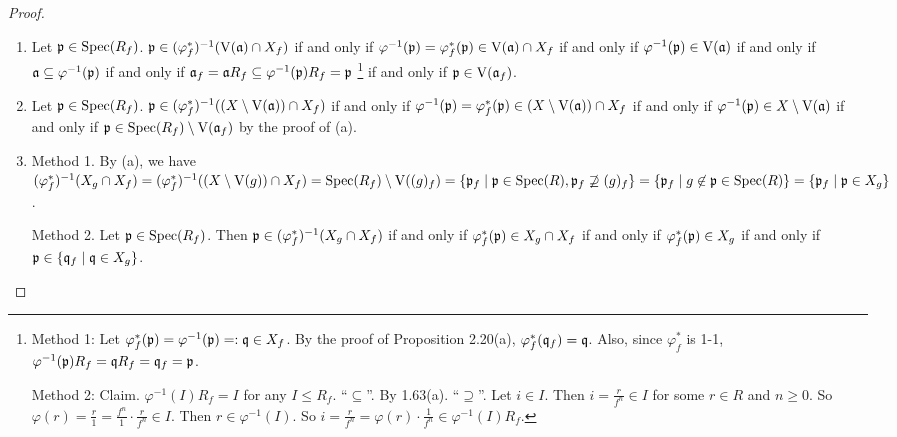 \begin{proof}
    \begin{enumerate}
        \item Let $\mathfrak{p} \in \operatorname{Spec}(R_f)$. $\mathfrak{p} \in (\varphi_f^*)^{-1}(\operatorname{V}(\mathfrak{a}) \cap X_f)$ if and only if $\varphi^{-1}(\mathfrak{p}) = \varphi_f^*(\mathfrak{p}) \in \operatorname{V}(\mathfrak{a}) \cap X_f$ if and only if $\varphi^{-1}(\mathfrak{p}) \in \operatorname{V}(\mathfrak{a})$ if and only if $\mathfrak{a} \subseteq \varphi^{-1}(\mathfrak{p})$ if and only if $\mathfrak{a}_f = \mathfrak{a} R_f \subseteq \varphi^{-1}(\mathfrak{p})R_f = \mathfrak{p}$ \footnote[2]{Method 1: Let $\varphi_f^*(\mathfrak{p}) = \varphi^{-1}(\mathfrak{p}) =: \mathfrak{q} \in X_f$. By the proof of Proposition 2.20(a), $\varphi_f^*(\mathfrak{q}_f) = \mathfrak{q}$. Also, since $\varphi_f^*$ is 1-1, $\varphi^{-1}(\mathfrak{p}) R_f = \mathfrak{q} R_f = \mathfrak{q}_f = \mathfrak{p}$. \par Method 2: Claim. $\varphi^{-1}(I)R_f = I$ for any $I \leq R_f$. ``$\subseteq$''. By 1.63(a). ``$\supseteq$''. Let $i \in I$. Then $i = \frac{r}{f^n} \in I$ for some $r \in R$ and $n \geq 0$. So $\varphi(r) = \frac{r}{1} = \frac{f^n}{1} \cdot \frac{r}{f^n} \in I$. Then $r \in \varphi^{-1}(I)$. So $i = \frac{r}{f^n} = \varphi(r) \cdot \frac{1}{f^n} \in \varphi^{-1}(I) R_f$.} if and only if $\mathfrak{p} \in \operatorname{V}(\mathfrak{a}_f)$.
        \item Let $\mathfrak{p} \in \operatorname{Spec}(R_f)$. $\mathfrak{p} \in (\varphi_f^*)^{-1}((X \setminus \operatorname{V}(\mathfrak{a})) \cap X_f)$ if and only if $\varphi^{-1}(\mathfrak{p}) = \varphi_f^*(\mathfrak{p}) \in (X \setminus \operatorname{V}(\mathfrak{a})) \cap X_f$ if and only if $\varphi^{-1}(\mathfrak{p}) \in X \setminus \operatorname{V}(\mathfrak{a})$ if and only if $\mathfrak{p} \in \operatorname{Spec}(R_f) \setminus \operatorname{V}(\mathfrak{a}_f)$ by the proof of (a).
        \item Method 1. By (a), we have $(\varphi^*_f)^{-1}(X_g \cap X_f) = (\varphi^*_f)^{-1}((X \setminus \operatorname{V}(g)) \cap X_f) = \operatorname{Spec}(R_f) \setminus \operatorname{V}((g)_f) = \{\mathfrak{p}_f \mid \mathfrak{p} \in \operatorname{Spec}(R), \mathfrak{p}_f \not \supseteq (g)_f\} = \{\mathfrak{p}_f \mid g \not \in \mathfrak{p} \in \operatorname{Spec}(R)\} = \{\mathfrak{p}_f \mid \mathfrak{p} \in X_g\}$. \par 
            Method 2. Let $\mathfrak{p} \in \operatorname{Spec}(R_f)$. Then $\mathfrak{p} \in (\varphi_f^*)^{-1}(X_g \cap X_f)$ if and only if $\varphi_f^*(\mathfrak{p}) \in X_g \cap X_f$ if and only if $\varphi_f^*(\mathfrak{p}) \in X_g$ if and only if $\mathfrak{p} \in \{\mathfrak{q}_f \mid \mathfrak{q} \in X_g\}$. \qedhere
    \end{enumerate}
\end{proof}

